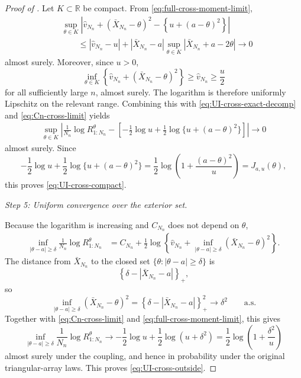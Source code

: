 \documentclass[12pt]{article}
\theoremstyle{spaced}
\theoremstyle{remark}
\begin{document}
\begin{proof}[Proof of ]
Let \(K\subset\mathbb R\) be compact.  From
\eqref{eq:full-cross-moment-limit},
\begin{align*}
&\sup_{\theta\in K}
\left|
\widehat v_{N_n}
+
(\bar X_{N_n}-\theta)^2
-
\left\{
u+(a-\theta)^2
\right\}
\right|\\
&\qquad\le
|\widehat v_{N_n}-u|
+
|\bar X_{N_n}-a|
\sup_{\theta\in K}
|\bar X_{N_n}+a-2\theta|
\longrightarrow0
\end{align*}
almost surely.  Moreover, since \(u>0\),
\[
\inf_{\theta\in K}
\left\{
\widehat v_{N_n}
+
(\bar X_{N_n}-\theta)^2
\right\}
\ge
\widehat v_{N_n}
\ge
\frac u2
\]
for all sufficiently large \(n\), almost surely.  The logarithm is
therefore uniformly Lipschitz on the relevant range.  Combining this
with \eqref{eq:UI-cross-exact-decomp} and
\eqref{eq:Cn-cross-limit} yields
\begin{align*}
\sup_{\theta\in K}
\left|
\frac1{N_n}\log R_{1:N_n}^{\theta}
-
\left[
-\frac12\log u
+
\frac12\log\{u+(a-\theta)^2\}
\right]
\right|
\longrightarrow0
\end{align*}
almost surely.  Since
\[
-\frac12\log u
+
\frac12\log\{u+(a-\theta)^2\}
=
\frac12\log\left(
1+\frac{(a-\theta)^2}{u}
\right)
=
J_{a,u}(\theta),
\]
this proves \eqref{eq:UI-cross-compact}.

\medskip
\noindent
\textit{Step 5: Uniform convergence over the exterior set.}

Because the logarithm is increasing and \(C_{N_n}\) does not depend
on \(\theta\),
\begin{align*}
\inf_{|\theta-a|\ge\delta}
\frac1{N_n}\log R_{1:N_n}^{\theta}
&=
C_{N_n}
+
\frac12\log\left\{
\widehat v_{N_n}
+
\inf_{|\theta-a|\ge\delta}
(\bar X_{N_n}-\theta)^2
\right\}.
\end{align*}
The distance from \(\bar X_{N_n}\) to the closed set
\(\{\theta:|\theta-a|\ge\delta\}\) is
\[
\left\{
\delta-|\bar X_{N_n}-a|
\right\}_+,
\]
so
\[
\inf_{|\theta-a|\ge\delta}
(\bar X_{N_n}-\theta)^2
=
\left\{
\delta-|\bar X_{N_n}-a|
\right\}_+^2
\longrightarrow\delta^2
\qquad\text{a.s.}
\]
Together with \eqref{eq:Cn-cross-limit} and
\eqref{eq:full-cross-moment-limit}, this gives
\[
\inf_{|\theta-a|\ge\delta}
\frac1{N_n}\log R_{1:N_n}^{\theta}
\longrightarrow
-\frac12\log u
+
\frac12\log(u+\delta^2)
=
\frac12\log\left(1+\frac{\delta^2}{u}\right)
\]
almost surely under the coupling, and hence in probability under the
original triangular-array laws.  This proves
\eqref{eq:UI-cross-outside}.
\end{proof}
\end{document}
